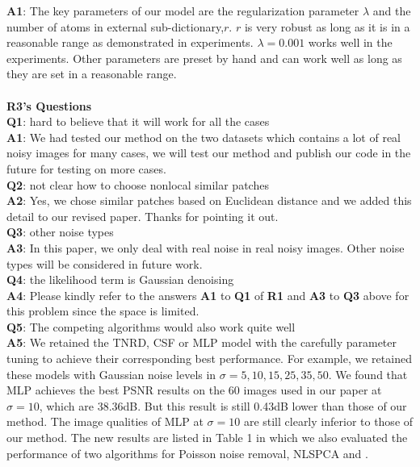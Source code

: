 \documentclass[10pt,twocolumn,letterpaper]{article}
\begin{document}
\textbf{A1}: The key parameters of our model are the regularization parameter $\lambda$ and the number of atoms in external sub-dictionary,$r$. $r$ is very robust as long as it is in a reasonable range as demonstrated in experiments. $\lambda=0.001$ works well in the experiments. Other parameters are preset by hand and can work well as long as they are set in a reasonable range.
\\
\\
\textbf{R3's Questions}
\\
\textbf{Q1}: hard to believe that it will work for all the cases
\\
\textbf{A1}: We had tested our method on the two datasets which contains a lot of real noisy images for many cases, we will test our method and publish our code in the future for testing on more cases.
\\
\textbf{Q2}: not clear how to choose nonlocal similar patches
\\
\textbf{A2}: Yes, we chose similar patches based on Euclidean distance and we added this detail to our revised paper. Thanks for pointing it out.
\\
\textbf{Q3}: other noise types
\\
\textbf{A3}: In this paper, we only deal with real noise in real noisy images. Other noise types will be considered in future work.
\\
\textbf{Q4}: the likelihood term is Gaussian denoising
\\
\textbf{A4}: Please kindly refer to the answers \textbf{A1} to \textbf{Q1} of \textbf{R1} and \textbf{A3} to \textbf{Q3} above for this problem since the space is limited. 
\\
\textbf{Q5}: The competing algorithms would also work quite well
\\
\textbf{A5}: We retained the TNRD, CSF or MLP model with the carefully parameter tuning to achieve their corresponding best performance. For example, we retained these models with Gaussian noise levels in $\sigma = 5, 10, 15, 25, 35, 50$. We found that MLP achieves the best PSNR results on the 60 images used in our paper at $\sigma = 10$, which are 38.36dB. But this result is still 0.43dB lower than those of our method. The image qualities of MLP at $\sigma = 10$ are still clearly inferior to those of our method. The new results are listed in Table 1 in which we also evaluated the performance of two algorithms for Poisson noise removal, NLSPCA \cite{nlpca} and \cite{makitalo2013optimal}. 
\end{document}
